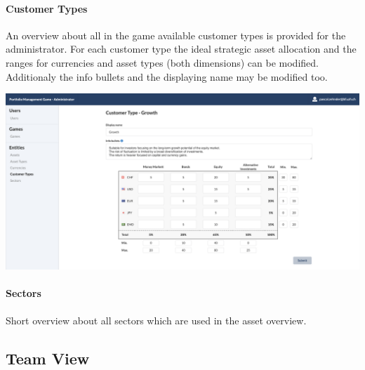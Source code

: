 \paragraph{Customer Types}
An overview about all in the game available customer types is provided for the administrator. For each customer type the ideal strategic asset allocation and the ranges for currencies and asset types (both dimensions) can be modified. Additionaly the info bullets and the displaying name may be modified too.
\begin{center}
  \includegraphics[scale=0.2]{img/application-overview/administrator/entities_customer_types.png}
\end{center}

\paragraph{Sectors}
Short overview about all sectors which are used in the asset overview.







\subsection{Team View}


